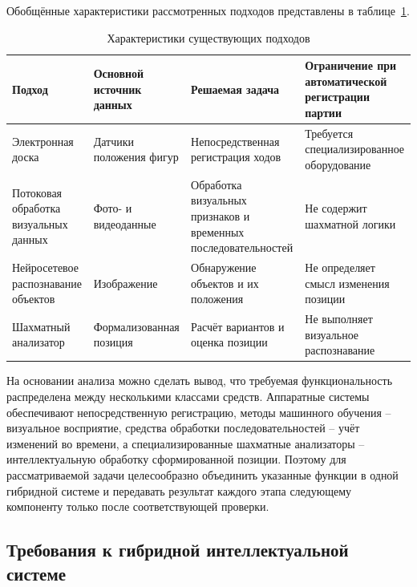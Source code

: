 Обобщённые характеристики рассмотренных подходов представлены в таблице~\ref{tab:approaches}.

\begin{table}[ht]
\centering
\caption{Характеристики существующих подходов}
\label{tab:approaches}
\begin{tabular}{|p{3.1cm}|p{3.1cm}|p{4.0cm}|p{4.0cm}|}
\hline
\textbf{Подход} & \textbf{Основной источник данных} & \textbf{Решаемая задача} & \textbf{Ограничение при автоматической регистрации партии} \\
\hline
Электронная доска & Датчики положения фигур & Непосредственная регистрация ходов & Требуется специализированное оборудование \\
\hline
Потоковая обработка визуальных данных & Фото- и видеоданные & Обработка визуальных признаков и временных последовательностей & Не содержит шахматной логики \\
\hline
Нейросетевое распознавание объектов & Изображение & Обнаружение объектов и их положения & Не определяет смысл изменения позиции \\
\hline
Шахматный анализатор & Формализованная позиция & Расчёт вариантов и оценка позиции & Не выполняет визуальное распознавание \\
\hline
\end{tabular}
\end{table}

На основании анализа можно сделать вывод, что требуемая функциональность распределена между несколькими классами средств. Аппаратные системы обеспечивают непосредственную регистрацию, методы машинного обучения -- визуальное восприятие, средства обработки последовательностей -- учёт изменений во времени, а специализированные шахматные анализаторы -- интеллектуальную обработку сформированной позиции. Поэтому для рассматриваемой задачи целесообразно объединить указанные функции в одной гибридной системе и передавать результат каждого этапа следующему компоненту только после соответствующей проверки.

\subsection{Требования к гибридной интеллектуальной системе}

